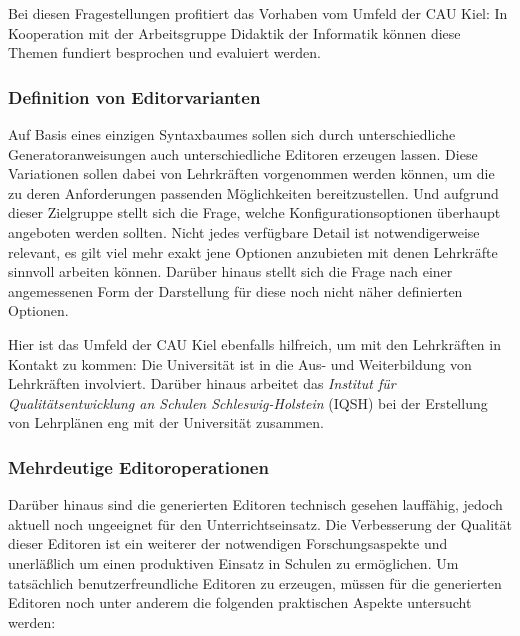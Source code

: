 \documentclass[paper=a4,fontsize=11pt,parskip=half]{scrartcl}
\begin{document}
Bei diesen Fragestellungen profitiert das Vorhaben vom Umfeld der CAU Kiel: In Kooperation mit der Arbeitsgruppe Didaktik der Informatik können diese Themen fundiert besprochen und evaluiert werden.

\subsubsection{Definition von Editorvarianten}

Auf Basis eines einzigen Syntaxbaumes sollen sich durch unterschiedliche Generatoranweisungen auch unterschiedliche Editoren erzeugen lassen. Diese Variationen sollen dabei von Lehrkräften vorgenommen werden können, um die zu deren Anforderungen passenden Möglichkeiten bereitzustellen. Und aufgrund dieser Zielgruppe stellt sich die Frage, welche Konfigurationsoptionen überhaupt angeboten werden sollten. Nicht jedes verfügbare Detail ist notwendigerweise relevant, es gilt viel mehr exakt jene Optionen anzubieten mit denen Lehrkräfte sinnvoll arbeiten können. Darüber hinaus stellt sich die Frage nach einer angemessenen Form der Darstellung für diese noch nicht näher definierten Optionen.

Hier ist das Umfeld der CAU Kiel ebenfalls hilfreich, um mit den Lehrkräften in Kontakt zu kommen: Die Universität ist in die Aus- und Weiterbildung von Lehrkräften involviert. Darüber hinaus arbeitet das \textit{Institut für Qualitätsentwicklung an Schulen Schleswig-Holstein} (IQSH) bei der Erstellung von Lehrplänen eng mit der Universität zusammen.

\subsubsection{Mehrdeutige Editoroperationen}

Darüber hinaus sind die generierten Editoren technisch gesehen lauffähig, jedoch aktuell noch ungeeignet für den Unterrichtseinsatz. Die Verbesserung der Qualität dieser Editoren ist ein weiterer der notwendigen Forschungsaspekte und unerläßlich um einen produktiven Einsatz in Schulen zu ermöglichen. Um tatsächlich benutzerfreundliche Editoren zu erzeugen, müssen für die generierten Editoren noch unter anderem die folgenden praktischen Aspekte untersucht werden:
\end{document}
